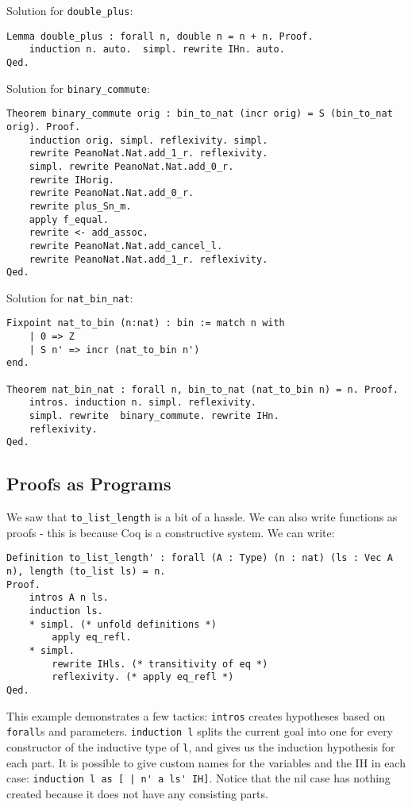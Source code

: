 Solution for \lstinline{double_plus}:
\begin{lstlisting}
Lemma double_plus : forall n, double n = n + n. Proof.
	induction n. auto.  simpl. rewrite IHn. auto.
Qed.
\end{lstlisting}

Solution for \lstinline{binary_commute}:
\begin{lstlisting}
Theorem binary_commute orig : bin_to_nat (incr orig) = S (bin_to_nat orig). Proof.
	induction orig. simpl. reflexivity. simpl.
	rewrite PeanoNat.Nat.add_1_r. reflexivity.
	simpl. rewrite PeanoNat.Nat.add_0_r.
	rewrite IHorig.
	rewrite PeanoNat.Nat.add_0_r.
	rewrite plus_Sn_m.
	apply f_equal.
	rewrite <- add_assoc.
	rewrite PeanoNat.Nat.add_cancel_l.
	rewrite PeanoNat.Nat.add_1_r. reflexivity.
Qed.
\end{lstlisting}

Solution for \lstinline{nat_bin_nat}:
\begin{lstlisting}
Fixpoint nat_to_bin (n:nat) : bin := match n with
	| 0 => Z
	| S n' => incr (nat_to_bin n')
end.

Theorem nat_bin_nat : forall n, bin_to_nat (nat_to_bin n) = n. Proof. 
	intros. induction n. simpl. reflexivity.
	simpl. rewrite  binary_commute. rewrite IHn.
	reflexivity. 
Qed.
\end{lstlisting}

\subsection{Proofs as Programs}

We saw that \lstinline{to_list_length} is a bit of a hassle. We can also write functions as proofs - this is because Coq is a
constructive system. We can write:
\begin{lstlisting}
Definition to_list_length' : forall (A : Type) (n : nat) (ls : Vec A n), length (to_list ls) = n.
Proof.
	intros A n ls.
	induction ls.
	* simpl. (* unfold definitions *)
		apply eq_refl.
	* simpl.
		rewrite IHls. (* transitivity of eq *)
		reflexivity. (* apply eq_refl *)
Qed.
\end{lstlisting}

This example demonstrates a few tactics: \lstinline{intros} creates hypotheses based on \lstinline{forall}s and parameters.
\lstinline{induction l} splits the current goal into one for every constructor of the inductive type of \lstinline{l}, and gives us
the induction hypothesis for each part. It is possible to give custom names for the variables and the IH in each case:
\lstinline{induction l as [ | n' a ls' IH]}. Notice that the nil case has nothing created because it does not have any consisting
parts.

